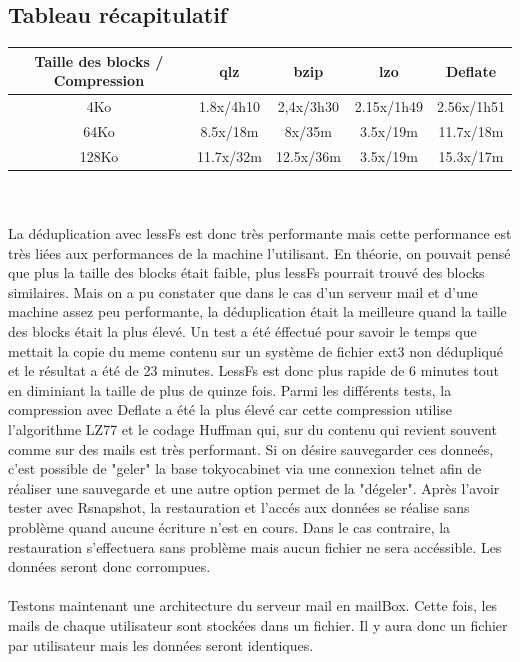 \documentclass[a4paper]{report}
\begin{document}
		\subsection{Tableau récapitulatif}
			\begin{tabular}{|c|c|c|c|c|}
			  \hline
			  Taille des blocks / Compression & qlz & bzip & lzo & Deflate\\
			  \hline
			  4Ko & 1.8x/4h10 & 2,4x/3h30 & 2.15x/1h49 & 2.56x/1h51 \\
			  \hline
			  64Ko & 8.5x/18m & 8x/35m & 3.5x/19m & 11.7x/18m \\
			  \hline
			  128Ko & 11.7x/32m & 12.5x/36m & 3.5x/19m & 15.3x/17m\\ 
			   \hline
			\end{tabular}\\\\
			La déduplication avec lessFs est donc très performante mais cette performance est très liées aux performances de la machine l'utilisant. En théorie, on pouvait pensé que plus la taille des blocks était faible, plus lessFs pourrait trouvé des blocks similaires. Mais on a pu constater que dans le cas d'un serveur mail et d'une machine assez peu performante, la déduplication était la meilleure quand la taille des blocks était la plus élevé. Un test a été éffectué pour savoir le temps que mettait la copie du meme contenu sur un système de fichier ext3 non dédupliqué et le résultat a été de 23 minutes. LessFs est donc plus rapide de 6 minutes tout en diminiant la taille de plus de quinze fois. Parmi les différents tests, la compression avec Deflate a été la plus élevé car cette compression utilise l'algorithme LZ77 et le codage Huffman qui, sur du contenu qui revient souvent comme sur des mails est très performant. Si on désire sauvegarder ces donneés, c'est possible de "geler" la base tokyocabinet via une connexion telnet afin de réaliser une sauvegarde et une autre option permet de la "dégeler". Après l'avoir tester avec Rsnapshot, la restauration et l'accés aux données se réalise sans problème quand aucune écriture n'est en cours. Dans le cas contraire, la restauration s'effectuera sans problème mais aucun fichier ne sera accéssible. Les données seront donc corrompues.\\\\

			Testons maintenant une architecture du serveur mail en mailBox. Cette fois, les mails de chaque utilisateur sont stockées dans un fichier. Il y aura donc un fichier par utilisateur mais les données seront identiques.
\end{document}
